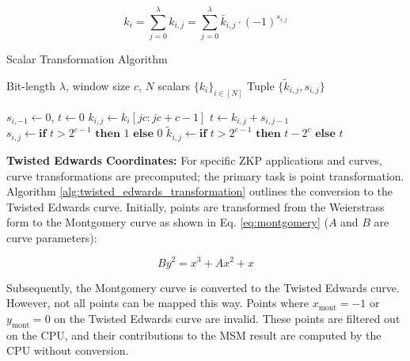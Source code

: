 \documentclass[conference]{IEEEtran}
\begin{document}
\begin{equation}
\label{eq:sclar-transformation}
k_i=\sum_{j=0}^{\lambda} k_{i, j}=\sum_{j=0}^{\lambda} \bar{k}_{i, j} \cdot(-1)^{s_{i, j}}
\end{equation}

\begin{algorithm}
\label{alg:scalar-transformation}
\caption{Scalar Transformation Algorithm}
\begin{algorithmic}[1] %
\REQUIRE Bit-length $\lambda$, window size $c$, $N$ scalars $\{k_i\}_{i \in [N]}$
\ENSURE Tuple $\{\widetilde{k}_{i,j}, s_{i,j}\}$

\STATE $s_{i,-1} \gets 0$, $t \gets 0$
    \STATE $k_{i,j} \gets k_i[jc : jc + c - 1]$
    \STATE $t \gets k_{i,j} + s_{i,j-1}$
    \STATE $s_{i,j} \gets \textbf{if } t > 2^{c-1} \textbf{ then } 1 \textbf{ else } 0$
    \STATE $\widetilde{k}_{i,j} \gets \textbf{if } t > 2^{c-1} \textbf{ then } t - 2^c \textbf{ else } t$
\ENDFOR

\end{algorithmic}
\end{algorithm}

\textbf{Twisted Edwards Coordinates:} For specific ZKP applications and curves, curve transformations are precomputed; the primary task is point transformation. Algorithm \ref{alg:twisted_edwards_transformation} outlines the conversion to the Twisted Edwards curve. Initially, points are transformed from the Weierstrass form to the Montgomery curve as shown in Eq. \eqref{eq:montgomery} ($A$ and $B$ are curve parameters):

\begin{equation}
\label{eq:montgomery}
B y^2 = x^3 + A x^2 + x
\end{equation}

Subsequently, the Montgomery curve is converted to the Twisted Edwards curve. However, not all points can be mapped this way. Points where \( x_{\text{mont}} = -1 \) or \( y_{\text{mont}} = 0 \) on the Twisted Edwards curve are invalid. These points are filtered out on the CPU, and their contributions to the MSM result are computed by the CPU without conversion.
\end{document}
